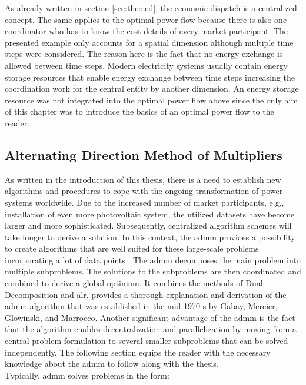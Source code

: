 As already written in section \ref{sec:theo:ed}, the economic dispatch is a centralized concept. The same applies to the optimal power flow because there is also one coordinator who has to know the cost details of every market participant. The presented example only accounts for a spatial dimension although multiple time steps were considered. The reason here is the fact that no energy exchange is allowed between time steps. Modern electricity systems usually contain energy storage resources that enable energy exchange between time steps increasing the coordination work for the central entity by another dimension. An energy storage resource was not integrated into the optimal power flow above since the only aim of this chapter was to introduce the basics of an optimal power flow to the reader.

\subsection{Alternating Direction Method of Multipliers}
\label{sec:theo:admm}

As written in the introduction of this thesis, there is a need to establish new algorithms and procedures to cope with the ongoing transformation of power systems worldwide. Due to the increased number of market participants, e.g., installation of even more photovoltaic system, the utilized datasets have become larger and more sophisticated. Subsequently, centralized algorithm schemes will take longer to derive a solution. In this context, the \gls{admm} provides a possibility to create algorithms that are well suited for these large-scale problems incorporating a lot of data points \citep{boyd2010}. The \gls{admm} decomposes the main problem into multiple subproblems. The solutions to the subproblems are then coordinated and combined to derive a global optimum. It combines the methods of Dual Decomposition and \gls{alr}. \citet{boyd2010} provides a thorough explanation and derivation of the \gls{admm} algorithm that was established in the mid-1970-s by Gabay, Mercier, Glowinski, and Marrocco. Another significant advantage of the \gls{admm} is the fact that the algorithm enables decentralization and parallelization by moving from a central problem formulation to several smaller subproblems that can be solved independently. The following section equips the reader with the necessary knowledge about the \gls{admm} to follow along with the thesis.\\

Typically, \gls{admm} solves problems in the form:

